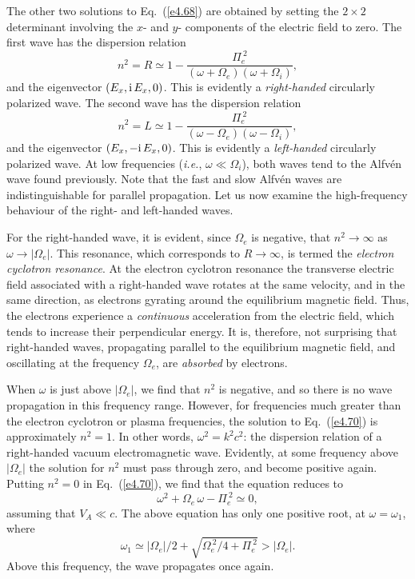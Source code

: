 The other two solutions to Eq.~(\ref{e4.68}) are obtained by setting the $2\times 2$
determinant involving the $x$- and $y$- components of the electric
field to zero. The first wave has the dispersion relation
\begin{equation}\label{e4.70}
n^2 = R \simeq 1 - \frac{{\Pi}_e^{~2}}{(\omega+{\Omega}_e)
(\omega+{\Omega}_i)},
\end{equation}
and the eigenvector $(E_x, {\rm i}\,E_x, 0)$. This is evidently
a {\em right-handed}\/ circularly polarized wave. 
The second wave has the dispersion relation
\begin{equation}\label{e4.71}
n^2 = L\simeq 1 - \frac{{\Pi}_e^{~2}}{(\omega-{\Omega}_e)
(\omega-{\Omega}_i)},
\end{equation}
and the eigenvector $(E_x, -{\rm i}\,E_x, 0)$. This is evidently
a {\em left-handed}\/ circularly polarized wave. At low frequencies
({\em i.e.}, $\omega\ll {\Omega}_i$), both waves tend to the
Alfv\'{e}n wave found previously. Note that the fast and
slow Alfv\'{e}n waves are indistinguishable for parallel
propagation. Let us now examine the high-frequency behaviour
of the right- and left-handed waves. 

For the right-handed wave, it is evident, since ${\Omega}_e$ is
negative, that $n^2\rightarrow\infty$ as $\omega\rightarrow|{\Omega}_e|$.
This resonance, which corresponds to $R\rightarrow\infty$, 
 is termed the {\em electron cyclotron resonance}. 
At the electron cyclotron  resonance the transverse electric field 
associated with a right-handed
wave rotates at the same velocity, and in the same direction, as electrons
gyrating around the equilibrium magnetic field. Thus, the electrons
experience a {\em continuous}\/ acceleration from the electric field, which tends
to increase their perpendicular energy. It is, therefore, not surprising that
right-handed waves, propagating
parallel to the equilibrium magnetic field,
and oscillating at the frequency ${\Omega}_e$, are {\em absorbed}\/ by 
electrons.

When $\omega$ is just above $|{\Omega}_e|$, we find that $n^2$ is negative,
and so there is no wave propagation in this frequency range. However, for frequencies
much greater than the electron cyclotron or plasma frequencies, the solution
to Eq.~(\ref{e4.70}) is approximately $n^2=1$. In other words, $\omega^2=k^2 c^2$: the
dispersion relation of a right-handed vacuum electromagnetic wave. 
Evidently, at some frequency above $|{\Omega}_e|$ the solution
for $n^2$ must pass through zero, and become positive again. 
Putting $n^2=0$ in Eq.~(\ref{e4.70}), we find that the equation reduces to
\begin{equation}
\omega^2+{\Omega}_e\,\omega- {\Pi}_e^{~2}\simeq 0,
\end{equation}
assuming that $V_A\ll c$. The above equation has only
one positive root, at $\omega=\omega_1$, where
\begin{equation}\label{e4.73}
\omega_1 \simeq |{\Omega}_e|/2 + \sqrt{{\Omega}_e^{~2}/4
+{\Pi}_e^{~2}}>|{\Omega}_e|.
\end{equation}
Above this frequency, the wave propagates once again.

